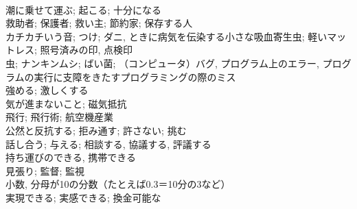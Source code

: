 \documentclass[8pt]{extreport}
\begin{document}
\begin{CJK}{UTF8}{min}
\\	潮に乗せて運ぶ; 起こる; 十分になる	
\\	救助者; 保護者; 救い主; 節約家; 保存する人	
\\	カチカチいう音; つけ; ダニ, ときに病気を伝染する小さな吸血寄生虫; 軽いマットレス; 照号済みの印, 点検印	
\\	虫; ナンキンムシ; ばい菌; （コンピュータ）バグ, プログラム上のエラー, プログラムの実行に支障をきたすプログラミングの際のミス	
\\	強める; 激しくする	
\\	気が進まないこと; 磁気抵抗	
\\	飛行; 飛行術; 航空機産業	
\\	公然と反抗する; 拒み通す; 許さない; 挑む	
\\	話し合う; 与える; 相談する, 協議する, 評議する	
\\	持ち運びのできる, 携帯できる	
\\	見張り; 監督; 監視	
\\	小数, 分母が10の分数（たとえば0.3＝10分の3など）	
\\	実現できる; 実感できる; 換金可能な	
\end{CJK}
\end{document}
